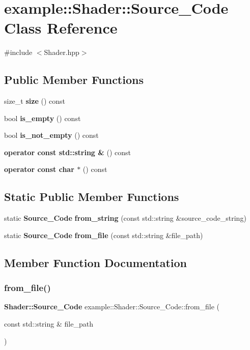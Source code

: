 \section{example\+::Shader\+::Source\+\_\+\+Code Class Reference}
\label{classexample_1_1_shader_1_1_source___code}


{\ttfamily \#include $<$Shader.\+hpp$>$}

\subsection*{Public Member Functions}
\begin{DoxyCompactItemize}
\item 
size\+\_\+t \textbf{ size} () const
\item 
bool \textbf{ is\+\_\+empty} () const
\item 
bool \textbf{ is\+\_\+not\+\_\+empty} () const
\item 
\textbf{ operator const std\+::string \&} () const
\item 
\textbf{ operator const char $\ast$} () const
\end{DoxyCompactItemize}
\subsection*{Static Public Member Functions}
\begin{DoxyCompactItemize}
\item 
static \textbf{ Source\+\_\+\+Code} \textbf{ from\+\_\+string} (const std\+::string \&source\+\_\+code\+\_\+string)
\item 
static \textbf{ Source\+\_\+\+Code} \textbf{ from\+\_\+file} (const std\+::string \&file\+\_\+path)
\end{DoxyCompactItemize}


\subsection{Member Function Documentation}
\mbox{\label{classexample_1_1_shader_1_1_source___code_ab242ffd8eddb3b50e5e31ab8d06bf09d}} 
\subsubsection{from\_file()}
{\footnotesize\ttfamily \textbf{ Shader\+::\+Source\+\_\+\+Code} example\+::\+Shader\+::\+Source\+\_\+\+Code\+::from\+\_\+file (\begin{DoxyParamCaption}\item[{const std\+::string \&}]{file\+\_\+path }\end{DoxyParamCaption})\hspace{0.3cm}{\ttfamily [static]}}


